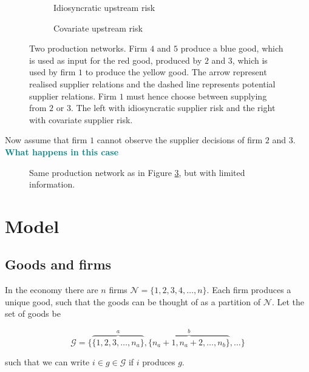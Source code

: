 \documentclass[american, abstract=on]{scrartcl}
\newcommand{\inputTikZ}[2]{%
      \scalebox{#1}{}  
    }
\newcommand{\G}{\mathcal{G}}
\newcommand{\N}{\mathcal{N}}
\newcommand\notes[1]{\textcolor{teal}{\textbf{#1}}}
\begin{document}
\begin{figure}[ht]
  \centering
  \begin{subfigure}{.5\textwidth}
    \centering
    \inputTikZ{0.7}{diagrams/example-idio.tikz} 
    \caption{Idiosyncratic upstream risk}
    \label{fig:example:idio}  
  \end{subfigure}%
  \begin{subfigure}{.5\textwidth}
    \centering
    \inputTikZ{0.7}{diagrams/example-covariate.tikz} 
    \caption{Covariate upstream risk}
    \label{fig:example:cov}
  \end{subfigure}
  \caption{Two production networks. Firm $4$ and $5$ produce a blue good, which is used as input for the red good, produced by $2$ and $3$, which is used by firm $1$ to produce the yellow good. The arrow represent realised supplier relations and the dashed line represents potential supplier relations. Firm $1$ must hence choose between supplying from $2$ or $3$. The left with idiosyncratic supplier risk and the right with covariate supplier risk.}
  \label{fig:example}
\end{figure}

Now assume that firm $1$ cannot observe the supplier decisions of firm $2$ and $3$. \notes{What happens in this case}

\begin{figure}[ht]
  \centering
  \inputTikZ{0.7}{diagrams/example-limited.tikz} 
  \caption{Same production network as in Figure \ref{fig:example}, but with limited information.}
  \label{fig:example:unknown}  
\end{figure}
\section{Model}

\subsection{Goods and firms}

In the economy there are $n$ firms $\N = \{1, 2, 3, 4, \ldots, n \}$. Each firm produces a unique good, such that the goods can be thought of as a partition of $\N$. Let the set of goods be

\begin{equation*}
    \G = \{ \overbrace{\{1, 2, 3, \ldots, n_a\}}^{a},  \overbrace{\{n_a + 1, n_a + 2, \ldots, n_b\}}^{b}, \ldots \} 
\end{equation*}

such that we can write $i \in g \in \mathcal{G}$ if $i$ produces $g$.

\newpage
\nocite{*}
\printbibliography
\end{document}
